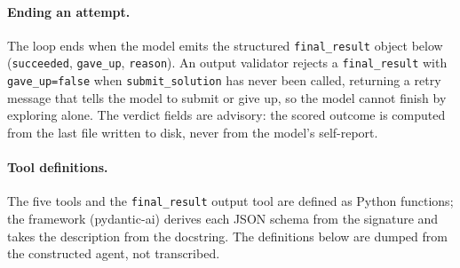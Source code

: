 \documentclass{article}
\begin{document}
\paragraph{Ending an attempt.} The loop ends when the model emits the structured
\texttt{final\_result} object below (\texttt{succeeded}, \texttt{gave\_up}, \texttt{reason}).
An output validator rejects a \texttt{final\_result} with \texttt{gave\_up=false} when
\texttt{submit\_solution} has never been called, returning a retry message that tells the model
to submit or give up, so the model cannot finish by exploring alone. The verdict fields are
advisory: the scored outcome is computed from the last file written to disk, never from the
model's self-report.

\paragraph{Tool definitions.} The five tools and the \texttt{final\_result} output tool are
defined as Python functions; the framework (pydantic-ai) derives each JSON schema from the
signature and takes the description from the docstring. The definitions below are dumped from
the constructed agent, not transcribed.
\end{document}
